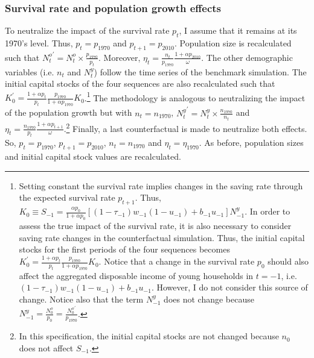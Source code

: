 \subsubsection{Survival rate and population growth effects}

To neutralize the impact of the survival rate $p_t$, I assume that it remains at its 1970's level. Thus, $p_t = p_{1970}$ and $p_{t+1} = p_{2010}$. Population size is recalculated such that ${N^o_t}^\prime = N_t^o\times\frac{p_{1970}}{p_t}$. Moreover, $\eta_t = \frac{n_t}{p_{1970}}\frac{1+\alpha p_{2010}}{\omega}$.
The other demographic variables (i.e. $n_t$ and $N^y_t$) follow the time series of the benchmark simulation. The initial capital stocks of the four sequences are also recalculated such that $K_0^\prime = \frac{1+\alpha p_t}{p_t}\frac{p_{1970}}{1+\alpha p_{1970}} K_0$.\footnote{Setting constant the survival rate implies changes in the saving rate through the expected survival rate $p_{t+1}$. Thus, $K_0 \equiv S_{-1} = \frac{\alpha p_0}{1+\alpha p_0}\left[(1-\tau_{-1})w_{-1}(1-u_{-1})+b_{-1}u_{-1}\right]N_{-1}^y$. In order to assess the true impact of the survival rate, it is also necessary to consider saving rate changes in the counterfactual simulation. Thus, the initial capital stocks for the first periods of the four sequences becomes $K_0^\prime = \frac{1+\alpha p_t}{p_t}\frac{p_{1970}}{1+\alpha p_{1970}} K_0$. Notice that a change in the survival rate $p_0$ should also affect the aggregated disposable income of young households in $t=-1$, i.e. $(1-\tau_{-1})w_{-1}(1-u_{-1})+b_{-1}u_{-1}$. However, I do not consider this source of change. Notice also that the term $N_{-1}^y$ does not change because $N_{-1}^y = \frac{N_0^o}{p_0} = \frac{{N_0^o}^\prime}{p_{1970}}$.} The methodology is analogous to neutralizing the impact of the population growth but with $n_t = n_{1970}$, ${N_t^y}^\prime = N_t^y\times\frac{n_{1970}}{n_t}$ and $\eta_t = \frac{n_{1970}}{p_t}\frac{1+\alpha p_{t+1}}{\omega}$.\footnote{In this specification, the initial capital stocks are not changed because $n_0$ does not affect $S_{-1}$.} Finally, a last counterfactual is made to neutralize both effects. So, $p_t = p_{1970}$, $p_{t+1} = p_{2010}$, $n_t = n_{1970}$ and $\eta_t = \eta_{1970}$. As before, population sizes and initial capital stock values are recalculated.
